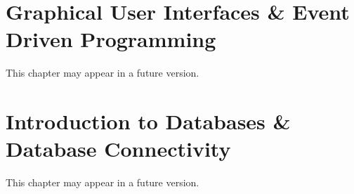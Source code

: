 
\chapter{Graphical User Interfaces \& Event Driven Programming}
\label{chapter:gui}

This chapter may appear in a future version.

\chapter{Introduction to Databases \& Database Connectivity}

This chapter may appear in a future version.

